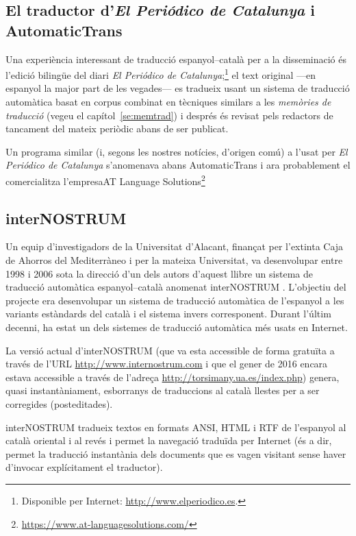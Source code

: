 \subsection{El traductor d'\emph{El Periódico de Catalunya} i AutomaticTrans}
\label{ss:ePdC}

Una experiència interessant \citep{fiteperiodico} de traducció
espanyol--català per a la disseminació és l'edició bilingüe del diari
\emph{El Periódico de Catalunya};\footnote{Disponible per Internet:
  \url{http://www.elperiodico.es}.} el text original ---en espanyol
la major part de les vegades--- es tradueix usant un sistema de
traducció automàtica basat en corpus combinat en tècniques similars a
les \emph{memòries de traducció} (vegeu el capítol~\ref{se:memtrad}) i
després és revisat pels redactors de tancament del mateix periòdic
abans de ser publicat.

Un programa similar (i, segons les nostres notícies, d'origen comú) a
l'usat per \emph{El Periódico de Catalunya} s'anomenava abans
AutomaticTrans i ara probablement el comercialitza l'empresaAT
Language
Solutions\footnote{\url{https://www.at-languagesolutions.com/}}


\subsection{interNOSTRUM}

Un equip d'investigadors de la Universitat d'Alacant, finançat per
l'extinta Caja de Ahorros del Mediterràneo i per la mateixa
Universitat, va desenvolupar entre 1998 i 2006 sota la direcció d'un
dels autors d'aquest llibre un sistema de traducció automàtica
espanyol--català anomenat \textsf{interNOSTRUM}
\citep{canals01a,canals01b}. L'objectiu del projecte era desenvolupar
un sistema de traducció automàtica de l'espanyol a les variants
estàndards del català i el sistema invers corresponent. Durant l'últim decenni, ha estat un dels sistemes de traducció automàtica més usats en Internet.

La versió actual d'{\sf interNOSTRUM} (que va esta accessible de forma
gratuïta a través de l'URL \url{http://www.internostrum.com} i que el
gener de 2016 encara estava accessible a través de l'adreça
\url{http://torsimany.ua.es/index.php}) genera, quasi instantàniament,
esborranys de traduccions al català llestes per a ser corregides
(posteditades). 

{\sf interNOSTRUM} tradueix textos en formats ANSI, HTML i RTF de
l'espanyol al català oriental i al revés i permet la navegació
traduïda per Internet (és a dir, permet la traducció instantània dels
documents que es vagen visitant sense haver d'invocar explícitament el
traductor).  

